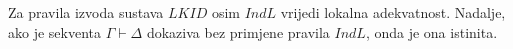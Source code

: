 \begin{theorem}
  Za pravila izvoda sustava \(\mathit{LKID}\) osim \(\mathit{IndL}\) vrijedi lokalna adekvatnost.
  Nadalje, ako je sekventa \(\Gamma \vdash \Delta\) dokaziva bez primjene pravila \(\mathit{IndL}\), onda je ona istinita.
\end{theorem}


